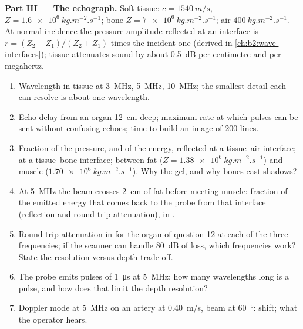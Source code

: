\begin{problem}
\medskip
\noindent\textbf{Part III --- The echograph.}
Soft tissue: $c = \qty{1540}{m/s}$, $Z = \qty{1.6e6}{kg.m^{-2}.s^{-1}}$; bone
$Z = \qty{7e6}{kg.m^{-2}.s^{-1}}$; air $\qty{400}{kg.m^{-2}.s^{-1}}$. At normal
incidence the pressure amplitude reflected at an interface is $r = (Z_2 -
Z_1)/(Z_2 + Z_1)$ times the incident one (derived in
\cref{ch:b2:wave-interfaces}); tissue attenuates sound by about
\qty{0.5}{dB} per centimetre and per megahertz.
\begin{enumerate}[resume]
  \item Wavelength in tissue at \qty{3}{MHz}, \qty{5}{MHz}, \qty{10}{MHz}; the
        smallest detail each can resolve is about one wavelength.
  \item Echo delay from an organ \qty{12}{cm} deep; maximum rate at which
        pulses can be sent without confusing echoes; time to build an
        image of $200$ lines.
  \item Fraction of the pressure, and of the energy, reflected at a
        tissue--air interface; at a tissue--bone interface; between fat
        ($Z = \qty{1.38e6}{kg.m^{-2}.s^{-1}}$) and muscle
        ($\qty{1.70e6}{kg.m^{-2}.s^{-1}}$). Why the gel, and why bones cast
        shadows?
  \item At \qty{5}{MHz} the beam crosses \qty{2}{cm} of fat before meeting
        muscle: fraction of the emitted energy that comes back to the
        probe from that interface (reflection and round-trip
        attenuation), in .
  \item Round-trip attenuation in  for the organ of question 12
        at each of the three frequencies; if the scanner can handle
        \qty{80}{dB} of loss, which frequencies work? State the resolution
        versus depth trade-off.
  \item The probe emits pulses of \qty{1}{\micro s} at \qty{5}{MHz}: how many
        wavelengths long is a pulse, and how does that limit the depth
        resolution?
  \item Doppler mode at \qty{5}{MHz} on an artery at \qty{0.40}{m/s}, beam at
        \qty{60}{\degree}: shift; what the operator hears.
\end{enumerate}


\end{problem}
